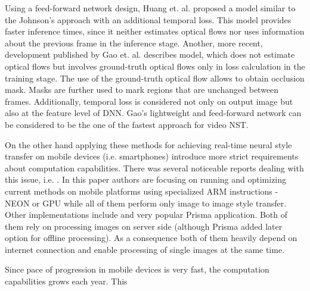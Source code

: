 \documentclass[a4paper,conference]{IEEEtran}
\begin{document}
Using a feed-forward network design, Huang et. al. \cite{Huang_2017_CVPR} proposed a model similar to the Johnson's approach \cite{JohnsonAL16} with an additional temporal loss. This model provides faster inference times, since it neither estimates optical flows nor uses information about the previous frame in the inference stage.  Another, more recent, development published by  Gao et. al. \cite{Reconet} describes model, which does not estimate optical flows but involves ground-truth optical flows only in loss calculation in the training stage. The use of the ground-truth optical flow allows to obtain occlusion mask. Masks are further used to mark regions that are unchanged between frames. Additionally, temporal loss is considered not only on output image but also at the feature level of DNN. Gao's lightweight and feed-forward network can be considered to be the one of the fastest approach for video NST.

On the other hand applying these methods for achieving real-time neural style transfer on mobile devices (i.e. smartphones) introduce more strict requirements about computation capabilities. There was several noticeable reports dealing with this issue, i.e. \cite{TinyTransformer,iosApp,Pictory}. In this paper authors are focusing on running and optimizing 
current methods on mobile platforms using specialized ARM instructions - NEON or 
 GPU while all of them perform only image to image style transfer.
Other implementations include \cite{Novecento} and very popular Prisma application. Both of them rely on processing images on server side (although Prisma added later option for offline processing). As a consequence both of them heavily depend on internet connection and enable processing of single images at the same time. 

Since pace of progression
 in mobile devices is very fast, the computation capabilities grows each year. This 
 
\end{document}
